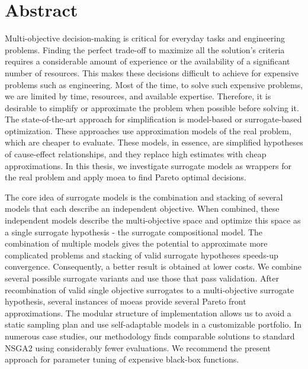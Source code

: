 \section*{Abstract}
    Multi-objective decision-making is critical for everyday tasks and engineering problems. Finding the perfect trade-off to maximize all the solution's criteria requires a considerable amount of experience or the availability of a significant number of resources. This makes these decisions difficult to achieve for expensive problems such as engineering. Most of the time, to solve such expensive problems, we are limited by time, resources, and available expertise. Therefore, it is desirable to simplify or approximate the problem when possible before solving it. The state-of-the-art approach for simplification is model-based or surrogate-based optimization. These approaches use approximation models of the real problem, which are cheaper to evaluate. These models, in essence, are simplified hypotheses of cause-effect relationships, and they replace high estimates with cheap approximations. In this thesis, we investigate surrogate models as wrappers for the real problem and apply \gls{moea} to find Pareto optimal decisions. 
        
    The core idea of surrogate models is the combination and stacking of several models that each describe an independent objective. When combined, these independent models describe the multi-objective space and optimize this space as a single surrogate hypothesis - the surrogate compositional model. The combination of multiple models gives the potential to approximate more complicated problems and stacking of valid surrogate hypotheses speeds-up convergence. Consequently, a better result is obtained at lower costs.
    We combine several possible surrogate variants and use those that pass validation. After recombination of valid single objective surrogates to a multi-objective surrogate hypothesis, several instances of \gls{moea}s provide several Pareto front approximations. The modular structure of implementation allows us to avoid a static sampling plan and use self-adaptable models in a customizable portfolio. In numerous case studies, our methodology finds comparable solutions to standard NSGA2 using considerably fewer evaluations. We recommend the present approach for parameter tuning of expensive black-box functions.